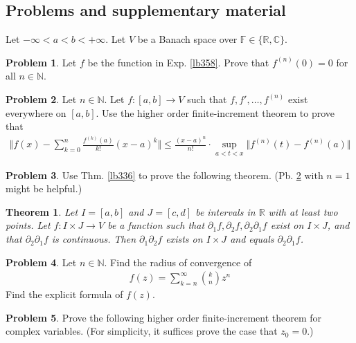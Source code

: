 \documentclass[12pt,b5paper,notitlepage]{article}
\theoremstyle{definition}
\newtheorem{prob}{\color{red}Problem}[section]
\theoremstyle{plain}
\newtheorem{thm}[df]{Theorem}
\newcommand{\Cbb}{\mathbb C}
\newcommand{\Nbb}{\mathbb N}
\newcommand{\Rbb}{\mathbb R}
\newcommand{\Fbb}{\mathbb F}
\numberwithin{equation}{section}
\begin{document}
\subsection{Problems and supplementary material}


Let $-\infty<a<b<+\infty$. Let $V$ be a Banach space over $\Fbb\in\{\Rbb,\Cbb\}$.


\begin{prob}
Let $f$ be the function in Exp. \ref{lb358}. Prove that $f^{(n)}(0)=0$ for all $n\in\Nbb$.
\end{prob}




\begin{prob}\label{lb361}
Let $n\in\Nbb$. Let $f:[a,b]\rightarrow V$ such that $f,f',\dots,f^{(n)}$ exist everywhere on $[a,b]$. Use the higher order finite-increment theorem to prove that
\begin{align*}
\Big\Vert f(x)-\sum_{k=0}^n\frac{f^{(k)}(a)}{k!}(x-a)^k\Big\Vert\leq \frac{(x-a)^{n}}{n!}\cdot \sup_{a<t<x}\Vert f^{(n)}(t)-f^{(n)}(a)\Vert 
\end{align*}
\end{prob}



\begin{prob}
Use Thm. \ref{lb336} to prove the following theorem. (Pb. \ref{lb361} with $n=1$ might be helpful.)
\end{prob}



\begin{thm}
Let $I=[a,b]$ and $J=[c,d]$ be intervals in $\Rbb$ with at least two points. Let $f:I\times J\rightarrow V$ be a function such that $\partial_1f,\partial_2f,\partial_2\partial_1f$ exist on $I\times J$, and that $\partial_2\partial_1f$ is continuous. Then $\partial_1\partial_2f$ exists on $I\times J$ and equals $\partial_2\partial_1f$.
\end{thm}






\begin{prob}\label{lb357}
Let $n\in\Nbb$. Find the radius of convergence of
\begin{align}
f(z)=\sum_{k=n}^\infty {k\choose n}z^n
\end{align}
Find the explicit formula of $f(z)$.
\end{prob}



\begin{prob}
Prove the following higher order finite-increment theorem for complex variables. (For simplicity, it suffices prove the case that $z_0=0$.)
\end{prob}
\end{document}
